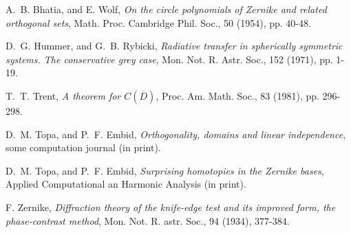 \begin{thebibliography}{1}

 {\sc A.~B. Bhatia, and E. Wolf}, {\em On the circle polynomials of Zernike and related orthogonal sets}, Math. Proc. Cambridge Phil. Soc., 50 (1954), pp. 40-48.

 {\sc D.~G. Hummer, and G.~B. Rybicki},
{\em Radiative transfer in spherically symmetric systems. The conservative grey case}, Mon. Not. R. Astr. Soc., 152 (1971), pp. 1-19.

 {\sc T.~T. Trent},
{\em A \ms theorem for $C(\overline{D})$}, Proc. Am. Math. Soc., 83 (1981), pp. 296-298.

 {\sc D.~M. Topa, and P.~F. Embid},
{\em Orthogonality, domains and linear independence}, some computation journal (in print).

 {\sc D.~M. Topa, and P.~F. Embid},
{\em Surprising homotopies in the Zernike bases}, Applied Computational an Harmonic Analysis (in print).

 {\sc F. Zernike}, {\em Diffraction theory of the knife-edge test and its improved form, the phase-contrast method}, Mon. Not. R. astr. Soc., 94 (1934), 377-384.

\end{thebibliography}

\endinput %